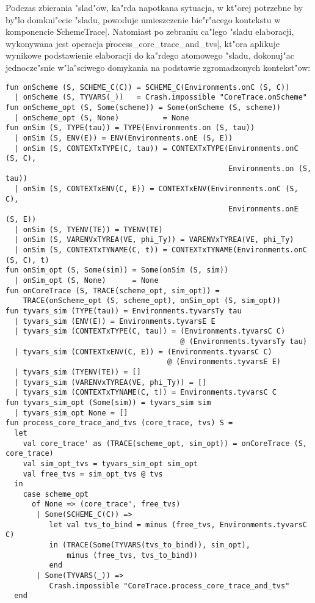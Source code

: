 Podczas zbierania "slad"ow, ka"rda napotkana sytuacja, 
w kt"orej potrzebne by by"lo domkni"ecie "sladu,
powoduje umieszczenie bie"r"acego kontekstu w komponencie \|SchemeTrace|.
Natomiast po zebraniu ca"lego "sladu elaboracji, wykonywana jest
operacja \|process_core_trace_and_tvs|, kt"ora aplikuje wynikowe podstawienie elaboracji
do ka"rdego atomowego "sladu, dokonuj"ac jednocze"snie w"la"sciwego domykania
na podstawie zgromadzonych kontekst"ow:
\pagebreak
\enlargethispage*{0.5cm}
{\small
\begin{verbatim}
fun onScheme (S, SCHEME_C(C)) = SCHEME_C(Environments.onC (S, C))
  | onScheme (S, TYVARS(_))   = Crash.impossible "CoreTrace.onScheme"
fun onScheme_opt (S, Some(scheme)) = Some(onScheme (S, scheme))
  | onScheme_opt (S, None)          = None
fun onSim (S, TYPE(tau)) = TYPE(Environments.on (S, tau))
  | onSim (S, ENV(E)) = ENV(Environments.onE (S, E))
  | onSim (S, CONTEXTxTYPE(C, tau)) = CONTEXTxTYPE(Environments.onC (S, C), 
                                                   Environments.on (S, tau))
  | onSim (S, CONTEXTxENV(C, E)) = CONTEXTxENV(Environments.onC (S, C), 
                                                   Environments.onE (S, E))
  | onSim (S, TYENV(TE)) = TYENV(TE)
  | onSim (S, VARENVxTYREA(VE, phi_Ty)) = VARENVxTYREA(VE, phi_Ty)
  | onSim (S, CONTEXTxTYNAME(C, t)) = CONTEXTxTYNAME(Environments.onC (S, C), t)
fun onSim_opt (S, Some(sim)) = Some(onSim (S, sim))
  | onSim_opt (S, None)      = None
fun onCoreTrace (S, TRACE(scheme_opt, sim_opt)) = 
    TRACE(onScheme_opt (S, scheme_opt), onSim_opt (S, sim_opt))   
fun tyvars_sim (TYPE(tau)) = Environments.tyvarsTy tau
  | tyvars_sim (ENV(E)) = Environments.tyvarsE E
  | tyvars_sim (CONTEXTxTYPE(C, tau)) = (Environments.tyvarsC C) 
                                        @ (Environments.tyvarsTy tau)
  | tyvars_sim (CONTEXTxENV(C, E)) = (Environments.tyvarsC C) 
                                     @ (Environments.tyvarsE E)
  | tyvars_sim (TYENV(TE)) = []
  | tyvars_sim (VARENVxTYREA(VE, phi_Ty)) = []
  | tyvars_sim (CONTEXTxTYNAME(C, t)) = Environments.tyvarsC C
fun tyvars_sim_opt (Some(sim)) = tyvars_sim sim
  | tyvars_sim_opt None = []
fun process_core_trace_and_tvs (core_trace, tvs) S = 
  let  
    val core_trace' as (TRACE(scheme_opt, sim_opt)) = onCoreTrace (S, core_trace)
    val sim_opt_tvs = tyvars_sim_opt sim_opt
    val free_tvs = sim_opt_tvs @ tvs
  in
    case scheme_opt 
      of None => (core_trace', free_tvs)
       | Some(SCHEME_C(C)) => 
          let val tvs_to_bind = minus (free_tvs, Environments.tyvarsC C)
          in (TRACE(Some(TYVARS(tvs_to_bind)), sim_opt),
              minus (free_tvs, tvs_to_bind))
          end
       | Some(TYVARS(_)) => 
          Crash.impossible "CoreTrace.process_core_trace_and_tvs" 
  end
\end{verbatim}
}
\addtolength{\hoffset}{-1cm}
\pagebreak
\addtolength{\hoffset}{1cm}
       
